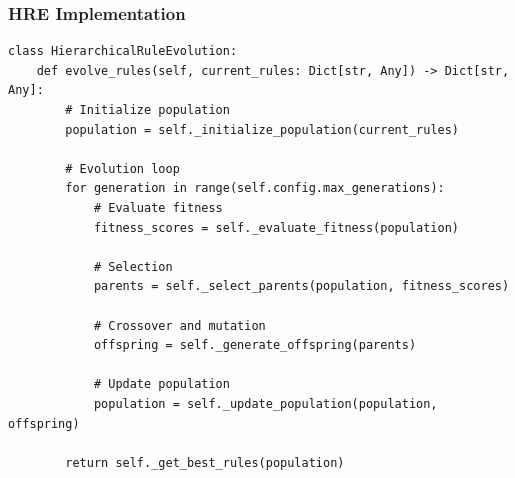 \documentclass{beamer}
\begin{document}
\begin{frame}[fragile]
\frametitle{HRE Implementation}
\begin{lstlisting}
class HierarchicalRuleEvolution:
    def evolve_rules(self, current_rules: Dict[str, Any]) -> Dict[str, Any]:
        # Initialize population
        population = self._initialize_population(current_rules)
        
        # Evolution loop
        for generation in range(self.config.max_generations):
            # Evaluate fitness
            fitness_scores = self._evaluate_fitness(population)
            
            # Selection
            parents = self._select_parents(population, fitness_scores)
            
            # Crossover and mutation
            offspring = self._generate_offspring(parents)
            
            # Update population
            population = self._update_population(population, offspring)
        
        return self._get_best_rules(population)
\end{lstlisting}
\end{frame}
\end{document}
